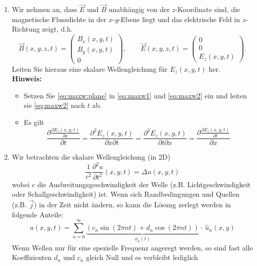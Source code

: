 \documentclass[a4paper,12pt]{article}
\begin{document}
\begin{task}{}
\begin{enumerate}
\item Wir nehmen an, dass $\vec{E}$ und $\vec{B}$ unabhängig von der $z$-Koordinate sind, die magnetische Flussdichte in der $x$-$y$-Ebene liegt und das elektrische Feld in $z$-Richtung zeigt, d.h.
\begin{equation} \label{eq:maxw:plane}
\vec{B}(x,y,z, t) = \left( \begin{array}{c} B_x(x,y, t) \\ B_y(x,y, t) \\ 0 \end{array} \right), \qquad 
  \vec{E}(x,y,z, t) = \left( \begin{array}{c} 0 \\ 0 \\ E_z(x,y, t) \end{array} \right). 
\end{equation}  
Leiten Sie hieraus eine skalare Wellengleichung für $E_z(x,y,t)$ her. \\
{\textbf{Hinweis:}} \\
\begin{itemize}
  \item Setzen Sie \eqref{eq:maxw:plane} in \eqref{eq:maxw1} und \eqref{eq:maxw2} ein und leiten sie \eqref{eq:maxw2} nach $t$ ab. 
  \item Es gilt 
  $$
  \frac{ \partial \frac{\partial E_z (x,y,t)}{\partial x}}{\partial t}
  = \frac{\partial^2 E_z (x,y,t)}{\partial x \partial t}
  = \frac{\partial^2 E_z (x,y,t)}{\partial t \partial x} 
  = \frac{ \partial \frac{\partial E_z (x,y,t)}{\partial t}}{\partial x}
  $$
\end{itemize}
\item Wir betrachten die skalare Wellengleichung (in 2D)
\begin{equation} \label{eq:wave}
  \frac{1}{c^2} \frac{\partial^2 u}{\partial t^2}(x,y,t) = \Delta u (x,y,t)
\end{equation}
wobei $c$ die Ausbreitungsgeschwindigkeit der Welle (z.B. Lichtgeschwindigkeit oder Schallgeschwindigkeit) ist. Wenn sich Randbedingungen und Quellen (z.B. $\vec{j}$) in der Zeit nicht ändern, so kann die Lösung zerlegt werden in folgende Anteile:
\begin{equation*}
  u(x,y,t) = \sum_{n=0}^{\infty} \underbrace{\left( c_n \sin(2 \pi n t) + 
  d_n \cos(2 \pi n t) \right)}_{\phi_n(t)} \cdot ~ \hat u_n(x,y) 
\end{equation*}
Wenn Wellen nur für eine spezielle Frequenz angeregt werden, so sind fast alle Koeffizienten $d_n$ und $c_n$ gleich Null und es verbleibt lediglich

\end{enumerate}
\end{task}
\end{document}
